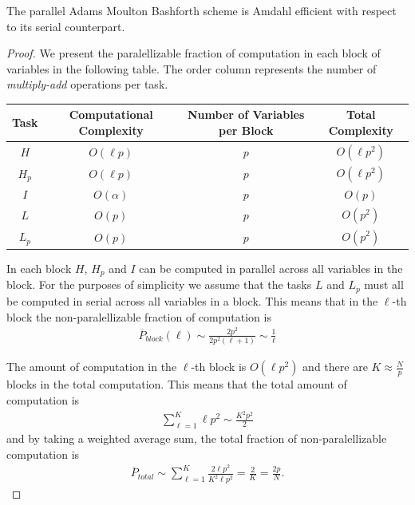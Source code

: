 \begin{proposition}
The parallel Adams Moulton Bashforth scheme is Amdahl efficient with respect to its serial counterpart.
\end{proposition}
\begin{proof}
We present the paralellizable fraction of computation in each block of variables in the following table. The order column represents the number of \emph{multiply-add} operations per task.

\begin{tabular}[ht]{|c|c|c|c|}
\hline
Task        & Computational Complexity  & Number of Variables per Block     & Total Complexity \\ \hline
$ H $       & $ O(\ell p ) $            & $ p $                             & $ O(\ell p^2) $ \\ \hline
$ H_p $     & $ O(\ell p ) $            & $ p $                             & $ O(\ell p^2) $ \\ \hline
$ I $       & $ O( \alpha ) $           & $ p $                             & $ O(p) $ \\ \hline \hline          
$ L $       & $ O( p ) $                & $ p $                             & $ O(p^2) $ \\ \hline
$ L_p $     & $ O( p ) $                & $ p $                             & $ O(p^2) $ \\ \hline
\end{tabular}

In each block $ H $, $ H_p $ and $ I $ can be computed in parallel across all variables in the block. For the purposes of simplicity we assume that the tasks $ L $ and $ L_p $ must all be computed in serial across all variables in a block. This means that in the $ \ell$-th block the non-paralellizable fraction of computation is
\begin{align}
    \overline{P}_{block}(\ell) \sim \frac{2p^2}{2p^2(\ell + 1) } \sim \frac{1}{\ell}
\end{align}

The amount of computation in the $ \ell$-th block is $ O(\ell p^2) $ and there are $ K \approx \frac{N}{p} $ blocks in the total computation. This means that the total amount of computation is
\begin{align}
    \sum_{\ell=1}^{K} \ell p^2 \sim \frac{K^2p^2}{2}
\end{align}
and by taking a weighted average sum, the total fraction of non-paralellizable computation is
\begin{align}
    \label{eq:tot_par_c}
    \overline{P}_{total} \sim \sum_{\ell = 1}^{K} \frac{2\ell p^2}{K^2 \ell p^2} = \frac{2}{K} = \frac{2p}{N}.
\end{align}


\end{proof}
